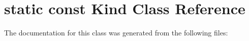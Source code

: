 \hypertarget{classstatic_01const_01Kind}{}\section{static const Kind Class Reference}
\label{classstatic_01const_01Kind}


The documentation for this class was generated from the following files\+: